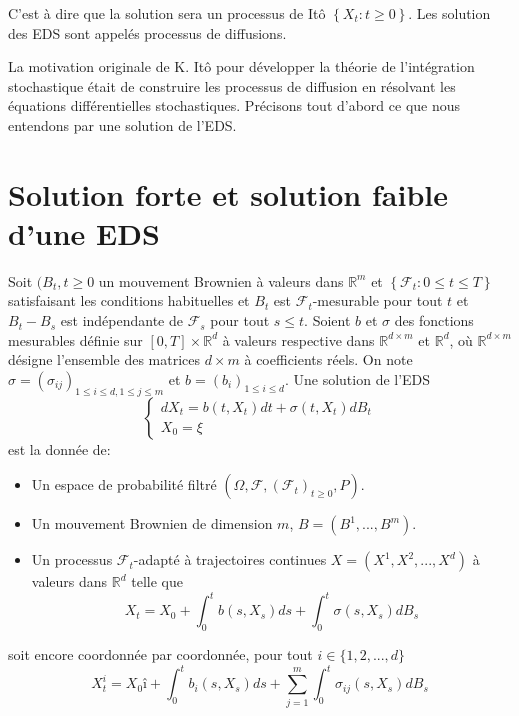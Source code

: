 \documentclass[A4paper,12pt]{report}
\newcommand{\R}{{\mathbb{R}}}
\begin{document}
C'est à dire que la solution sera un processus de Itô $\left\{X_{t}: t \geq 0\right\}$. Les solution des EDS sont appelés processus de diffusions.

La motivation originale de K. Itô pour développer la théorie de l'intégration stochastique était de construire les processus de diffusion en résolvant les équations différentielles stochastiques.
Précisons tout d'abord ce que nous entendons par une solution de l'EDS.
\section{Solution forte et solution faible d'une EDS}
Soit $(B_{t}, t \geq 0$ un mouvement Brownien à valeurs dans $\mathbb{R}^{m}$ et $\left\{\mathcal{F}_{t}: 0 \leq t \leq T\right\}$ satisfaisant les conditions habituelles et $B_{t}$ est $\mathcal{F}_{t}$-mesurable pour tout $t$ et $B_{t}-B_{s}$ est indépendante de $\mathcal{F}_{s}$ pour tout $s \leq t$.
Soient $b$ et $\sigma$ des fonctions mesurables définie sur  $[0, T]\times \mathbb{R}^{d}$ à valeurs respective dans $\R^{d \times m}$ et $\R^{d}$, où $\R^{d \times m}$ désigne l'ensemble des matrices $d\times m $ à coefficients réels. On note $\sigma = (\sigma_{ij})_{1\leq i \leq d, 1\leq j \leq m}$ et $b=(b_i)_{1\leq i \leq d}$. Une solution de l'EDS
\begin{equation}\label{E18}
\left\{\begin{array}{l}
d X_{t}=b\left(t, X_{t}\right) d t+\sigma\left(t, X_{t}\right) d B_{t}\\
X_{0}= \xi 
\end{array}\right.
\end{equation}
est la donnée de:
\begin{itemize}
\item Un espace de probabilité filtré $\left(\Omega, \mathcal{F},\left(\mathcal{F}_{t}\right)_{t \geq 0}, P\right)$.
\item Un mouvement Brownien de dimension $m$, $B = (B^{1},..., B^{m})$.
\item Un processus $\mathcal{F}_t$-adapté à trajectoires continues $X=(X^1, X^2,..., X^d)$ à valeurs dans $\R^d$ telle
que 
\begin{equation}\label{E19}
X_{t}= X_0+\int_{0}^{t} b\left(s, X_{s}\right) d s+\int_{0}^{t} \sigma\left(s, X_{s}\right) d B_{s}
\end{equation}
\end{itemize}
soit encore coordonnée par coordonnée, pour tout $i \in \{1, 2,...,d\}$
$$X_{t}^i= X_0 î + \int_{0}^{t} b_i\left(s, X_{s}\right) d s+ \sum_{j=1} ^{m}\int_{0}^{t} \sigma_{ij}\left(s, X_{s}\right) d B_{s}$$
\end{document}
